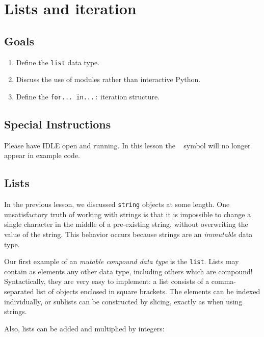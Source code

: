 \documentclass[m3380-lec-main.tex]{subfiles}
\begin{document}
\chapter{Lists and iteration}

\section*{Goals}
\begin{enumerate}[1.~]\setlength{\itemsep}{0pt}
\item Define the \verb|list| data type.
\item Discuss the use of modules rather than interactive Python.
\item Define the \verb|for... in...:| iteration structure.
\end{enumerate}

\section*{Special Instructions}
Please have IDLE open and running. In this lesson the \car~ symbol will no longer appear in example code.

\section{Lists} In the previous lesson, we discussed \verb|string| objects at some length. One unsatisfactory truth of working with strings is that it is impossible to change a single character in the middle of a pre-existing string, without overwriting the value of the string. This behavior occurs because strings are an \emph{immutable} data type.

Our first example of an \emph{mutable compound data type} is the \verb|list|. Lists may contain as elements any other data type, including others which are compound! Syntactically, they are very easy to implement: a list consists of a comma-separated list of objects enclosed in square brackets. The elements can be indexed individually, or sublists can be constructed by slicing, exactly as when using strings.

\noindent
Also, lists can be added and multiplied by integers:

\noindent
\end{document}
